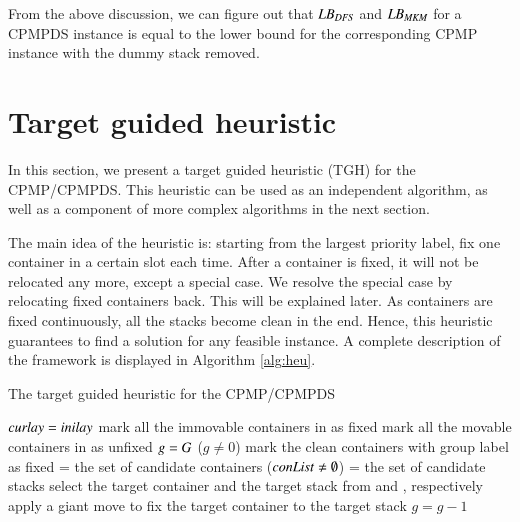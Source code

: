 \documentclass[review,3p,times,authoryear,12pt]{elsarticle}
\begin{document}
From the above discussion, we can figure out that $\id{LB}_\id{DFS}$ and $\id{LB}_\id{MKM}$ for a CPMPDS instance is equal to the lower bound for the corresponding CPMP instance with the dummy stack removed.

\section{Target guided heuristic}
\label{sec:heu}

In this section, we present a target guided heuristic (TGH) for the CPMP/CPMPDS. This heuristic can be used as an independent algorithm, as well as a component of more complex algorithms in the next section.

The main idea of the heuristic is: starting from the largest priority label, fix one container in a certain slot each time. After a container is fixed, it will not be relocated any more, except a special case. We resolve the special case by relocating fixed containers back. This will be explained later.
As containers are fixed continuously, all the stacks become clean in the end. Hence, this heuristic guarantees to find a solution for any feasible instance. A complete description of the framework is displayed in Algorithm \ref{alg:heu}. 

\begin{algorithm}[htbp]
	\caption{The target guided heuristic for the CPMP/CPMPDS}
	\label{alg:heu}
	\begin{codebox}
	\li $\id{curlay} = \id{inilay}$
    \li mark all the immovable containers in  as fixed
    \li mark all the movable containers in  as unfixed
    \li $\id{g} = G$
    \li \While ($g\neq0$)
    \li \Do
            mark the clean containers with group label  as fixed\label{heu:c}
    \li     {} = the set of candidate containers
    \li     \While($\id{conList} \neq \emptyset$)\label{heu:l}
    \li     \Do
                 = the set of candidate stacks
    \li         select the target container and the target stack from  and , respectively
    \li         apply a giant move to fix the target container to the target stack
            \End
    \li $g=g-1$
        \End
	\end{codebox}	
\end{algorithm}
\end{document}
